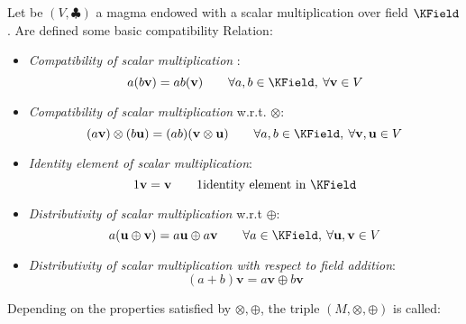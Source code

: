 \documentclass[a4paper,12pt]{scrartcl}
\newcommand{\OpA}{\otimes}
\newcommand{\OpB}{\oplus}
\begin{document}
Let be $(V, \clubsuit)$ a magma endowed with a scalar multiplication over field $\KField$.
Are defined some basic compatibility  Relation:
\begin{itemize}
\item \emph{Compatibility of scalar multiplication} :
	\begin{equation}\label{scalarmulti}
		a ( b \mathbf{v} ) = ab (\mathbf{v}) \qquad \forall a,b \in \KField,\: \forall \mathbf{v} \in V
	\end{equation}
\item \emph{Compatibility of scalar multiplication} w.r.t. $\OpA$:
	\begin{equation}\label{scalarcompat}
		 (a \mathbf{v} ) \OpA (b \mathbf{u)}= (ab) (\mathbf{v}\OpA \mathbf{u}) \qquad 
		 \forall a,b \in \KField,\: \forall \mathbf{v},\mathbf{u} \in V
	\end{equation}
\item \emph{Identity element of scalar multiplication}:
	\begin{equation}\label{scalaridentity}
		1 \mathbf{v} = \mathbf{v}  \qquad 1 \textrm{identity element in $\KField$}
	\end{equation}
\item \emph{Distributivity of scalar multiplication} w.r.t $\OpB$:
	\begin{equation}\label{scalarDistributivityA}
		a ( \mathbf{u} \OpB \mathbf{v} ) = a \mathbf{u} \OpB a \mathbf{v} \qquad \forall a \in\KField,\: \forall \mathbf{u},\mathbf{v}\in V
	\end{equation}
\item \emph{Distributivity of scalar multiplication with respect to field addition}:
	\begin{equation}\label{scalarDistributivityB}
		(a +b ) \mathbf{v} = a  \mathbf{v}  \OpB  b \mathbf{v}
	\end{equation}
\end{itemize}

Depending on the properties satisfied by $\OpA,\OpB$, the triple $(M,\OpA,\OpB)$ is called:
\end{document}
